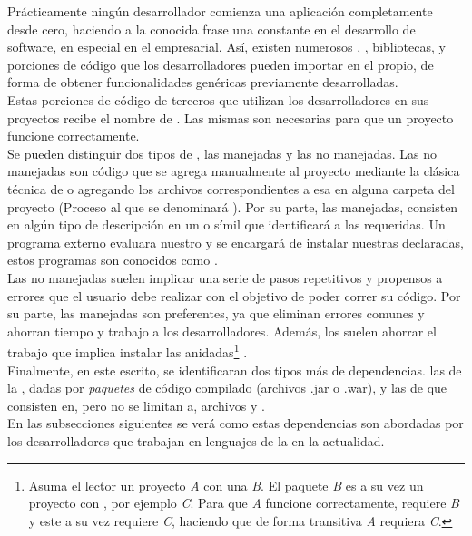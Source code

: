 Prácticamente ningún desarrollador comienza una aplicación completamente desde
cero, haciendo a la conocida frase  una
constante en el desarrollo de software, en especial en el empresarial. Así, existen
numerosos \frameworks, \toolkits, bibliotecas, y porciones de código que los
desarrolladores pueden importar en el propio, de forma de obtener funcionalidades
genéricas previamente desarrolladas.\\
Estas porciones de código de terceros que utilizan los desarrolladores en sus
proyectos recibe el nombre de \dependencies. Las mismas son necesarias
para que un proyecto funcione correctamente.\\
Se pueden distinguir dos tipos de \dependencies, las manejadas y las no manejadas.
Las \dependencies no manejadas son código que se agrega manualmente al
proyecto mediante la clásica técnica de  o agregando los archivos
correspondientes a esa \dependency en alguna carpeta del proyecto (Proceso al que
se denominará ). Por su parte, las manejadas, consisten en algún tipo de
descripción en un \conffile o símil que identificará a las \dependencies
requeridas. Un programa externo evaluara nuestro \conffile y se encargará
de instalar nuestras \dependencies declaradas, estos programas son conocidos como
\depmgrs.\\
Las \dependencies no manejadas suelen implicar una serie de pasos repetitivos y propensos
a errores que el usuario debe realizar con el objetivo de poder correr su código. Por su
parte, las \dependencies manejadas son preferentes, ya que eliminan errores comunes y
ahorran tiempo y trabajo a los desarrolladores. Además, los \depmgrs
suelen ahorrar el trabajo que implica instalar las \dependencies anidadas\footnote{
	Asuma el lector un proyecto \emph{A} con una \dependency \emph{B}. El paquete \emph{B}
	es a su vez un proyecto con \dependencies, por ejemplo \emph{C}. Para que \emph{A}
	funcione correctamente, requiere \emph{B} y este a su vez requiere \emph{C}, haciendo
	que de forma transitiva \emph{A} requiera \emph{C}.
} .\\
Finalmente, en este escrito, se identificaran dos tipos más de dependencias. las de la
\logictier, dadas por \emph{paquetes} de código \java compilado (archivos .jar o .war),
y las de \viewtier que consisten en, pero no se limitan a, archivos \css y \js.\\
En las subsecciones siguientes se verá como estas dependencias son abordadas por los
desarrolladores que trabajan en lenguajes de la \jvm en la actualidad.

